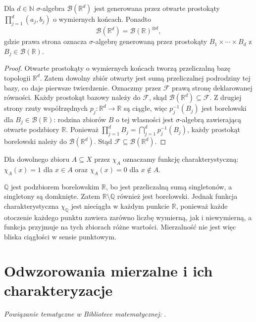 \begin{twierdzenie}
\label{thm:borel-Rd}
Dla $d\in\mathbb N$ $\sigma$-algebra $\mathcal B(\mathbb R^d)$
jest generowana przez otwarte prostokąty
$\prod_{j=1}^d(a_j,b_j)$ o wymiernych końcach. Ponadto
\[
\mathcal B(\mathbb R^d)=\mathcal B(\mathbb R)^{\otimes d},
\]
gdzie prawa strona oznacza $\sigma$-algebrę generowaną przez
prostokąty $B_1\times\cdots\times B_d$ z $B_j\in\mathcal B(\mathbb R)$.
\end{twierdzenie}
\begin{proof}
Otwarte prostokąty o wymiernych końcach tworzą przeliczalną bazę
topologii $\mathbb R^d$. Zatem dowolny zbiór otwarty jest sumą
przeliczalnej podrodziny tej bazy, co daje pierwsze twierdzenie.
Oznaczmy przez $\mathcal F$ prawą stronę deklarowanej równości.
Każdy prostokąt bazowy należy do $\mathcal F$, skąd
$\mathcal B(\mathbb R^d)\subseteq\mathcal F$.
Z drugiej strony rzuty współrzędnych $p_j:\mathbb R^d\to\mathbb R$
są ciągłe, więc $p_j^{-1}(B_j)$ jest borelowski dla
$B_j\in\mathcal B(\mathbb R)$: rodzina zbiorów $B$ o tej
własności jest $\sigma$-algebrą zawierającą otwarte podzbiory
$\mathbb R$. Ponieważ
$\prod_{j=1}^dB_j=\bigcap_{j=1}^dp_j^{-1}(B_j)$,
każdy prostokąt borelowski należy do $\mathcal B(\mathbb R^d)$.
Stąd $\mathcal F\subseteq\mathcal B(\mathbb R^d)$.
\end{proof}

Dla dowolnego zbioru $A\subseteq X$ przez $\chi_A$ oznaczamy
funkcję charakterystyczną: $\chi_A(x)=1$ dla $x\in A$
oraz $\chi_A(x)=0$ dla $x\notin A$.

\begin{przyklad}
$\mathbb Q$ jest podzbiorem borelowskim $\mathbb R$, bo jest
przeliczalną sumą singletonów, a singletony są domknięte.
Zatem $\mathbb R\setminus\mathbb Q$ również jest borelowski.
Jednak funkcja charakterystyczna $\chi_{\mathbb Q}$ jest nieciągła
w każdym punkcie $\mathbb R$, ponieważ każde otoczenie
każdego punktu zawiera zarówno liczbę wymierną, jak i niewymierną,
a funkcja przyjmuje na tych zbiorach różne wartości.
Mierzalność nie jest więc bliska
ciągłości w sensie punktowym.
\end{przyklad}

\section{Odwzorowania mierzalne i ich charakteryzacje}

\noindent\emph{Powiązanie tematyczne w Bibliotece matematycznej:} .


